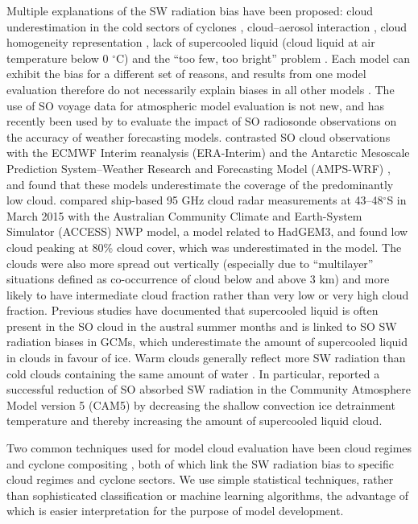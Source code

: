 Multiple explanations of the SW radiation bias have been proposed: cloud
underestimation in the cold sectors of cyclones \citep{bodas-salcedo2014},
cloud--aerosol interaction \citep{vergara-temprado2018}, cloud homogeneity
representation \citep{loveridge2018}, lack of supercooled liquid (cloud liquid
at air temperature below 0 $^\circ$C) \citep{kay2016,bodas-salcedo2016} and the
``too few, too bright'' problem \citep{nam2012,klein2013,wall2017}. Each model
can exhibit the bias for a different set of reasons, and results from one model
evaluation therefore do not necessarily explain biases in all other models
\citep{mason2015}. The use of SO voyage data for atmospheric model evaluation
is not new, and has recently been used by \cite{sato2018} to evaluate the
impact of SO radiosonde observations on the accuracy of weather forecasting
models. \cite{klekociuk2018} contrasted SO cloud observations with the ECMWF
Interim reanalysis (ERA-Interim) and the Antarctic Mesoscale Prediction
System--Weather Research and Forecasting Model (AMPS-WRF) \citep{powers2012},
and found that these
models underestimate the coverage of the predominantly low cloud.
\cite{protat2017} compared ship-based 95 GHz cloud radar measurements at
43--48$^\circ$S in March 2015 with the Australian Community Climate and
Earth-System Simulator (ACCESS) NWP model, a model related to HadGEM3, and
found low cloud peaking at 80\% cloud cover, which was underestimated in the
model. The clouds were also more spread out vertically (especially due to
``multilayer'' situations defined as co-occurrence of cloud below and above 3
km) and more likely to have intermediate cloud fraction rather than very low or
very high cloud fraction. Previous studies have documented that supercooled
liquid is often present in the SO cloud in the austral summer months
\citep{morrison2011,huang2012,chubb2013,huang2016,bodas-salcedo2016,jolly2018,listowski2019}
and is linked to SO SW radiation biases in GCMs, which underestimate the amount
of supercooled liquid in clouds in favour of ice. Warm clouds generally reflect
more SW radiation than cold clouds containing the same amount of water
\citep{vergara-temprado2018}. In particular, \cite{kay2016} reported a
successful reduction of SO absorbed SW radiation in the Community Atmosphere
Model version 5 (CAM5) by decreasing the shallow convection ice detrainment
temperature and thereby increasing the amount of supercooled liquid cloud.

Two common techniques used for model cloud evaluation have been cloud regimes
\citep{williams2009,haynes2011,mason2014,mason2015,mcdonald2016,jin2017,mcdonald2018,schuddeboom2018a,schuddeboom2019}
and cyclone compositing
\citep{bodas-salcedo2012,williams2013,bodas-salcedo2014,bodas-salcedo2016,williams2017},
both of which link the SW radiation bias to specific cloud regimes and cyclone
sectors. We use simple statistical techniques, rather than sophisticated
classification or machine learning algorithms, the advantage of which is easier
interpretation for the purpose of model development.

